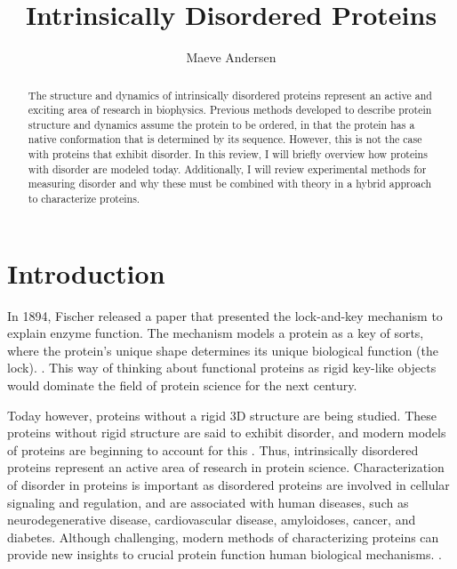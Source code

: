 \documentclass{article}
\title{Intrinsically Disordered Proteins}
\author{Maeve Andersen}
\begin{document}
\maketitle

\begin{abstract}
    The structure and dynamics of intrinsically disordered proteins represent an active and exciting area of research in biophysics.
    Previous methods developed to describe protein structure and dynamics assume the protein to be ordered, in that the protein has a native conformation that is determined by its sequence.
    However, this is not the case with proteins that exhibit disorder.
    In this review, I will briefly overview how proteins with disorder are modeled today.
    Additionally, I will review experimental methods for measuring disorder and why these must be combined with theory in a hybrid approach to characterize proteins.
\end{abstract}


\section{Introduction}
In 1894, Fischer released a paper that presented the lock-and-key mechanism to explain enzyme function.
The mechanism models a protein as a key of sorts, where the protein's unique shape determines its unique biological function (the lock). \cite{fischerEinflussConfigurationAuf1894}.
This way of thinking about functional proteins as rigid key-like objects would dominate the field of protein science for the next century.

Today however, proteins without a rigid 3D structure are being studied.
These proteins without rigid structure are said to exhibit disorder, and modern models of proteins are beginning to account for this \cite{thomasenConformationalEnsemblesIntrinsically2022}.
Thus, intrinsically disordered proteins represent an active area of research in protein science.
Characterization of disorder in proteins is important as disordered proteins are involved in cellular signaling and regulation,\cite{wrightIntrinsicallyDisorderedProteins2015}
and are associated with human diseases, such as neurodegenerative disease, cardiovascular disease, amyloidoses, cancer, and diabetes.\cite{uverskyIntrinsicallyDisorderedProteins2008}
Although challenging, modern methods of characterizing proteins can provide new insights to crucial protein function human biological mechanisms. \cite{bonomiSimultaneousDeterminationProtein2018}.
\end{document}
